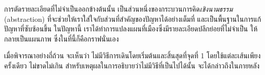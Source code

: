 การตัดรายละเอียดที่ไม่จำเป็นออกข้างต้นนั้น เป็นส่วนหนึ่งของกระบวนการคิด\emph{เชิงนามธรรม} (abstraction) ที่จะช่วยให้เราใส่ใจกับส่วนที่สำคัญของปัญหาได้อย่างเต็มที่ และเป็นพื้นฐานในการแก้ปัญหาที่ซับซ้อนขึ้น \enskip ในปัญหานี้ เราได้ทำการแปลงแผนที่เมืองซึ่งมีรายละเอียดปลีกย่อยที่ไม่จำเป็น ให้กลายเป็นแผนภาพ ซึ่งในที่นี้ก็คือกราฟนั่นเอง

เมื่อพิจารณาอย่างถี่ถ้วน จะเห็นว่า ไม่มีวิธีการเดินโดยเริ่มต้นและสิ้นสุดที่จุดที่ 1 โดยใช้แต่ละเส้นเพียงครั้งเดียว ไม่ขาดไม่เกิน \enskip สำหรับเหตุผลในการอธิบายว่าไม่มีวิธีที่เป็นไปได้นั้น จะได้กล่าวถึงในภายหลัง





